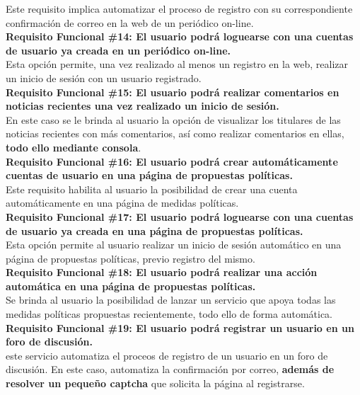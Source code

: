 \begin{adjustwidth}{0.5cm}{}
	Este requisito implica automatizar el proceso de registro con su correspondiente confirmación de correo en la web de un periódico on-line. \\
	\linebreak
	\textbf{Requisito Funcional \#14: El usuario podrá loguearse con una cuentas de usuario ya creada en un periódico on-line.}\\
	Esta opción permite, una vez realizado al menos un registro en la web, realizar un inicio de sesión con un usuario registrado. \\
	\linebreak				
	\textbf{Requisito Funcional \#15: El usuario podrá realizar comentarios en noticias recientes una vez realizado un inicio de sesión.}\\
	En este caso se le brinda al usuario la opción de visualizar los titulares de las noticias recientes con más comentarios, así como realizar comentarios en ellas, \textbf{todo ello mediante consola}. \\
	\linebreak			
	\textbf{Requisito Funcional \#16: El usuario podrá crear automáticamente cuentas de usuario en una página de propuestas políticas.}\\
	Este requisito habilita al usuario la posibilidad de crear una cuenta automáticamente en una página de medidas políticas. \\
	\linebreak	
	\textbf{Requisito Funcional \#17: El usuario podrá loguearse con una cuentas de usuario ya creada en una página de propuestas políticas.}\\
	Esta opción permite al usuario realizar un inicio de sesión automático en una página de propuestas políticas, previo registro del mismo. \\
	\linebreak				
	\textbf{Requisito Funcional \#18: El usuario podrá realizar una acción automática en una página de propuestas políticas.}\\
	Se brinda al usuario la posibilidad de lanzar un servicio que apoya todas las medidas políticas propuestas recientemente, todo ello de forma automática.\\			
	\linebreak		
	\textbf{Requisito Funcional \#19: El usuario podrá registrar un usuario en un foro de discusión.}\\
	este servicio automatiza el proceos de registro de un usuario en un foro de discusión. En este caso, automatiza la confirmación por correo, \textbf{además de resolver un pequeño captcha} que solicita la página al registrarse. \\

\end{adjustwidth}
